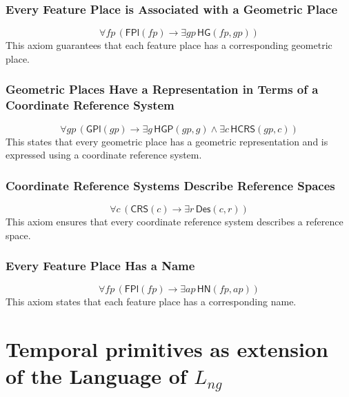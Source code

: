 \subsubsection{Every Feature Place is Associated with a Geometric Place}
\begin{equation}\label{eq:axiom4}
    \forall fp \, (\textsf{FPl}(fp) \rightarrow \exists gp \, \textsf{HG}(fp, gp))
\end{equation}
This axiom guarantees that each feature place has a corresponding geometric place.

\subsubsection{Geometric Places Have a Representation in Terms of a Coordinate Reference System}
\begin{equation}\label{eq:axiom5}
    \forall gp \, (\textsf{GPl}(gp) \rightarrow \exists g \, \textsf{HGP}(gp, g) \land \exists c \, \textsf{HCRS}(gp, c))
\end{equation}
This states that every geometric place has a geometric representation and is expressed using a coordinate reference system.

\subsubsection{Coordinate Reference Systems Describe Reference Spaces}
\begin{equation}\label{eq:axiom6}
    \forall c \, (\textsf{CRS}(c) \rightarrow \exists r \, \textsf{Des}(c, r))
\end{equation}
This axiom ensures that every coordinate reference system describes a reference space.


\subsubsection{Every Feature Place Has a Name}
\begin{equation}\label{eq:axiom7}
    \forall fp \, (\textsf{FPl}(fp) \rightarrow \exists ap \, \textsf{HN}(fp, ap))
\end{equation}
This axiom states that each feature place has a corresponding name.

\section{Temporal primitives as extension of the Language of \( L_{ng} \)}\label{V-sec:temporal-primitives}


